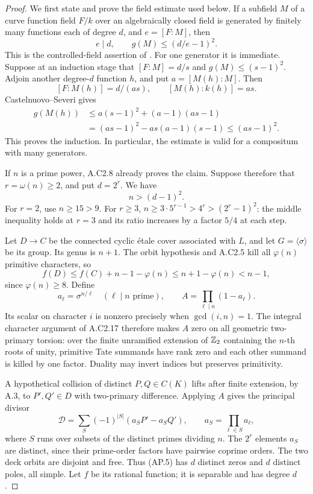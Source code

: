 \begin{proof}
We first state and prove the field estimate used below.
If a subfield $M$ of a curve function field $F/k$ over
an algebraically closed field is generated by finitely
many functions each of degree $d$, and $e=[F:M]$,
then
\[
                    e\mid d,\qquad
                    g(M)\le(d/e-1)^2.                    \tag{AP.1}
\]
This is the controlled-field assertion of
\citet[Lemma 2.2 and Corollary 2.3, author p.~3]
{A_PrimPoonen2007}. For one generator it is immediate.
Suppose at an induction stage that $[F:M]=d/s$
and $g(M)\le(s-1)^2$. Adjoin another degree-$d$
function $h$, and put $a=[M(h):M]$. Then
\[
       [F:M(h)]=d/(as),\qquad [M(h):k(h)]=as.
\]
Castelnuovo--Severi gives
\[
 \begin{aligned}
 g(M(h))
 &\le a(s-1)^2+(a-1)(as-1)\\
 &=(as-1)^2-as(a-1)(s-1)\le(as-1)^2.
 \end{aligned}
\]
This proves the induction. In particular, the estimate
is valid for a compositum with many generators.

If $n$ is a prime power, A.C2.8 already proves the
claim. Suppose therefore that $r=\omega(n)\ge2$,
and put $d=2^r$. We have
\[
                            n>(d-1)^2.                   \tag{AP.2}
\]
For $r=2$, use $n\ge15>9$. For $r\ge3$,
$n\ge3\cdot5^{r-1}>4^r>(2^r-1)^2$:
the middle inequality holds at $r=3$ and its ratio
increases by a factor $5/4$ at each step.

Let $D\to C$ be the connected cyclic \'etale cover
associated with $L$, and let $G=\langle\sigma\rangle$
be its group. Its genus is $n+1$. The orbit hypothesis
and A.C2.5 kill all $\varphi(n)$ primitive characters,
so
\[
 f(D)\le f(C)+n-1-\varphi(n)
       \le n+1-\varphi(n)<n-1,                            \tag{AP.3}
\]
since $\varphi(n)\ge8$.
Define
\[
 a_\ell=\sigma^{n/\ell}\quad(\ell\mid n\text{ prime}),
 \qquad A=\prod_{\ell\mid n}(1-a_\ell).
                                                               \tag{AP.4}
\]
Its scalar on character $i$ is nonzero precisely when
$\gcd(i,n)=1$. The integral character argument of
A.C2.17 therefore makes $A$ zero on all geometric
two-primary torsion: over the finite unramified
extension of $\mathbb Z_2$ containing the $n$-th roots of
unity, primitive Tate summands have rank zero and
each other summand is killed by one factor.
Duality may invert indices but preserves primitivity.

A hypothetical collision of distinct $P,Q\in C(K)$
lifts after finite extension, by A.3, to $P',Q'\in D$
with two-primary difference. Applying $A$ gives the
principal divisor
\[
 \mathcal D=\sum_{S}(-1)^{|S|}
                    (a_SP'-a_SQ'),\qquad
 a_S=\prod_{\ell\in S}a_\ell,                             \tag{AP.5}
\]
where $S$ runs over subsets of the distinct primes
dividing $n$.
The $2^r$ elements $a_S$ are distinct, since their
prime-order factors have pairwise coprime orders.
The two deck orbits are disjoint and free.
Thus (AP.5) has $d$ distinct zeros and $d$ distinct
poles, all simple. Let $f$ be its rational function;
it is separable and has degree $d$.


\end{proof}
